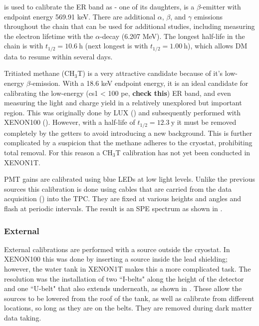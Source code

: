 \radoncal is used to calibrate the ER band as  - one of its daughters, is a $\beta$-emitter with endpoint energy
569.91 keV.  There are additional $\alpha$, $\beta$, and $\gamma$ emissions throughout the chain that can be used for additional studies,
including measuring the electron lifetime with the  $\alpha$-decay (6.207 MeV).  The longest half-life in the chain is
 with $t_{1/2} = 10.6\ \mathrm{h}$ (next longest is  with $t_{1/2} = 1.00\ \mathrm{h}$), which allows DM data
to resume within several days.

Tritiated methane (CH$_{3}$T) is a very attractive candidate because of it's low-energy $\beta$-emission.  With a 18.6 keV endpoint energy,
it is an ideal candidate for calibrating the low-energy (cs1 < 100 pe, \textbf{check this}) ER band, and even measuring the light and
charge yield in a relatively unexplored but important
region.  This was originally done by LUX () and subsequently performed with XENON100 ().  However,
with a half-life of $t_{1/2} = 12.3\ \mathrm{y}$ it must be removed completely by the getters to avoid introducing a new background.  This
is further complicated by a suspicion that the methane adheres to the cryostat, prohibiting total removal.  For this reason a CH$_3$T
calibration has not yet been conducted in XENON1T.

PMT gains are calibrated using blue LEDs at low light levels.  Unlike the previous sources this calibration is done using cables that are
carried from the data acquisition () into the TPC.  They are fixed at various heights and angles and flash
at periodic intervals.  The result is an SPE spectrum as shown in .

\subsubsection{External}
\label{subsubsec:xenon1t_calibrations_external}
External calibrations are performed with a source outside the cryostat.  In XENON100 this was done by inserting a source inside the lead
shielding; however, the water tank in XENON1T makes this a more complicated task.  The resolution was the installation of two ``I-belts"
along the height of the detector and one ``U-belt" that also extends underneath, as shown in .  These
allow the sources to be lowered from the roof of the tank, as well as calibrate from different locations, so long as they are on the
belts.  They are removed during dark matter data taking.


